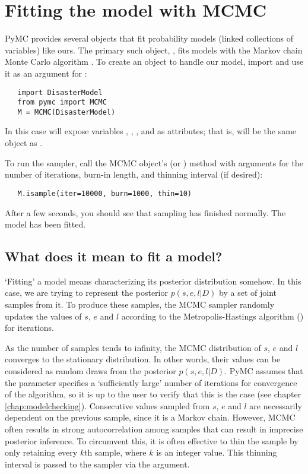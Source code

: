 \section{Fitting the model with MCMC}

PyMC provides several objects that fit probability models (linked collections of variables) like ours. The primary such object, , fits models with the Markov chain Monte Carlo algorithm \cite{Gamerman:1997tb}. To create an  object to handle our model, import  and use it as an argument for :
\begin{verbatim}
   import DisasterModel
   from pymc import MCMC
   M = MCMC(DisasterModel)
\end{verbatim}
In this case  will expose variables , , ,  and  as attributes; that is,  will be the same object as .

To run the sampler, call the MCMC object's  (or ) method with arguments for the number of iterations, burn-in length, and thinning interval (if desired):
\begin{verbatim}
   M.isample(iter=10000, burn=1000, thin=10)
\end{verbatim}
After a few seconds, you should see that sampling has finished normally. The model has been fitted.

\subsection{What does it mean to fit a model?}

`Fitting' a model means characterizing its posterior distribution somehow. In this case, we are trying to represent the posterior $p(s,e,l|D)$ by a set of joint samples from it. To produce these samples, the MCMC sampler randomly updates the values of $s$, $e$ and $l$ according to the Metropolis-Hastings algorithm (\cite{gelman}) for   iterations.

As the number of samples tends to infinity, the MCMC distribution of $s$, $e$
and $l$ converges to the stationary distribution. In other words, their
values can be considered as random draws from the posterior $p(s,e,l|D)$. 
PyMC assumes that the  parameter specifies a `sufficiently large'
number of iterations for convergence of the algorithm, so it is up to the user
to verify
that this is the case (see chapter \ref{chap:modelchecking}). Consecutive values
sampled from $s$, $e$ and $l$ are necessarily dependent on the previous sample,
since it is a Markov chain. However, MCMC often results in strong
autocorrelation among samples that can result in imprecise posterior inference.
To circumvent this, it is often effective to thin the sample by only retaining
every $k$th sample, where $k$ is an integer value. This thinning interval is
passed to the sampler via the  argument.

